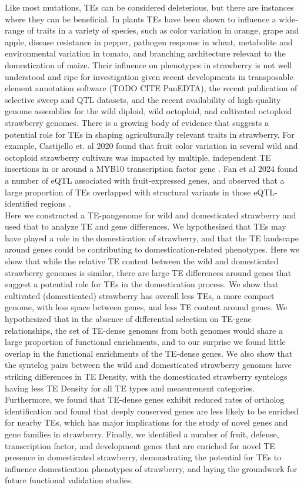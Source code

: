 \documentclass[fleqn,10pt]{olplainarticle}
\begin{document}
Like most mutations, TEs can be considered deleterious, but there are instances where they can be beneficial.
In plants TEs have been shown to influence a wide-range of traits in a variety of species, such as color variation in orange, grape and apple, disease resistance in pepper, pathogen response in wheat, metabolite and environmental variation in tomato, and branching architecture relevant to the domestication of maize.
Their influence on phenotypes in strawberry is not well understood and ripe for investigation given recent developments in transposable element annotation software \cite{Ou2019} (TODO CITE PanEDTA), the recent publication of selective sweep and QTL datasets, and the recent availability of high-quality genome assemblies for the wild diploid, wild octoploid, and cultivated octoploid strawberry genomes. 
There is a growing body of evidence that suggests a potential role for TEs in shaping agriculturally relevant traits in strawberry.
For example, Castijello et. al 2020 found that fruit color variation in several wild and octoploid strawberry cultivars was impacted by multiple, independent TE insertions in or around a MYB10 transcription factor gene \cite{Castillejo2020}.
Fan et al 2024 found a number of eQTL associated with fruit-expressed genes, and observed that a large proportion of TEs overlapped with structural variants in those eQTL-identified regions \cite{Fan2022}.\\

Here we constructed a TE-pangenome for wild and domesticated strawberry and used that to analyze TE and gene differences.
We hypothesized that TEs may have played a role in the domestication of strawberry, and that the TE landscape around genes could be contributing to domestication-related phenotypes.
Here we show that while the relative TE content between the wild and domesticated strawberry genomes is similar, there are large TE differences around genes that suggest a potential role for TEs in the domestication process.
We show that cultivated (domesticated) strawberry has overall less TEs, a more compact genome, with less space between genes, and less TE content around genes.
We hypothesized that in the absence of differential selection on TE-gene relationships, the set of TE-dense genomes from both genomes would share a large proportion of functional enrichments, and to our surprise we found little overlap in the functional enrichments of the TE-dense genes.
We also show that the syntelog pairs between the wild and domesticated strawberry genomes have striking differences in TE Density, with the domesticated strawberry syntelogs having less TE Density for all TE types and measurement categories.
Furthermore, we found that TE-dense genes exhibit reduced rates of ortholog identification and found that deeply conserved genes are less likely to be enriched for nearby TEs, which has major implications for the study of novel genes and gene families in strawberry.
Finally, we identified a number of fruit, defense, transcription factor, and development genes that are enriched for novel TE presence in domesticated strawberry, demonstrating the potential for TEs to influence domestication phenotypes of strawberry, and laying the groundwork for future functional validation studies. \\ 
\end{document}
